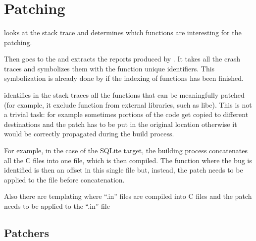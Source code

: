 \section{Patching}
\label{patching}



\paragraph{\poiguy}

\poiguy looks at the stack trace and determines which functions are interesting for the patching.

Then \poiguy goes to the \analysisgraph and extracts the reports produced by \povguy.
It takes all the crash traces and symbolizes them with the function unique identifiers.
This symbolization is already done by \povguy if the indexing of functions has been finished.

\poiguy identifies in the stack traces all the functions that can be meaningfully patched (for example, it exclude function from external libraries, such as libc).
This is not a trivial task: for example sometimes portions of the code get copied to different destinations and the patch has to be put in the original location otherwise it would be correctly propagated during the build process.

For example, in the case of the SQLite target, the building process concatenates all the C files into one file, which is then compiled. The function where the bug is identified is then an offset in this single file but, instead, the patch needs to be applied to the file before concatenation.

Also there are templating where ``.in'' files are compiled into C files and the patch needs to be applied to the ``.in'' file


\subsection{Patchers}

